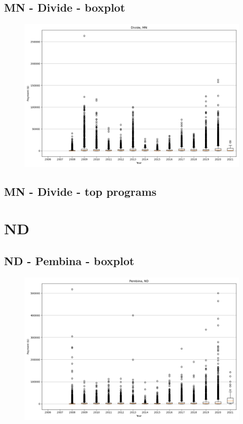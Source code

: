 \subsection*{MN - Divide - boxplot}
\begin{figure}[h]
\centering
\includegraphics[width=7in]{../output/boxplots/counties/Divide-MN_boxplot.png}
\end{figure}


\subsection*{MN - Divide - top programs}

\newpage
\section*{ND}
\subsection*{ND - Pembina - boxplot}
\begin{figure}[h]
\centering
\includegraphics[width=7in]{../output/boxplots/counties/Pembina-ND_boxplot.png}
\end{figure}


